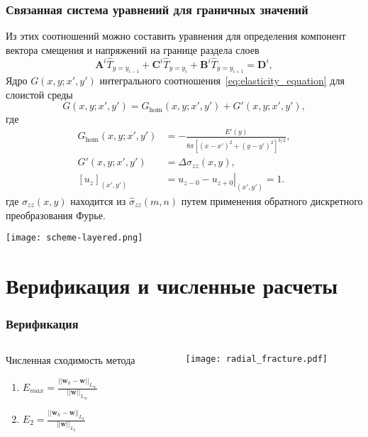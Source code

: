 \begin{frame}
    \frametitle{Связанная система уравнений для граничных значений}
    Из этих соотношений можно составить уравнения для определения компонент вектора смещения и напряжений на границе раздела слоев
    \begin{equation}
        \label{eq:coupled-system}
        \textbf{A}^i \hat{T}_{y=y_{i-1}} +
        \textbf{C}^i \hat{T}_{y=y_{i}} + 
        \textbf{B}^i \hat{T}_{y=y_{i+1}}
        = \textbf{D}^i,
    \end{equation}
    Ядро $G(x,y;x',y')$ интегрального соотношения~\eqref{eq:elasticity_equation} для слоистой среды
    \begin{equation}
        G(x,y;x',y') = G_\text{hom}(x,y;x',y') + G'(x,y;x',y'),
    \end{equation} 
    где
    \begin{equation}
        \begin{split}
            G_\text{hom}(x,y;x',y') & = - \frac{E'(y)}{8\pi [(x\!-\!x')^2+(y\!-\!y')^2]^{3/2}},\\
            G'(x,y;x',y') & = \Delta \sigma_{zz}(x,y),\\
            \left[u_{z} \right]_{(x',y')} & = \left.u_{z-0} - u_{z+0}\right|_{(x',y')} = 1.
        \end{split}
    \end{equation}
    где $\sigma_{zz}(x,y)$ находится из $\hat{\sigma}_{zz}(m,n)$ путем применения обратного дискретного преобразования Фурье.
\end{frame}

\begin{frame}
    \centering
    \texttt{[image: scheme-layered.png]}
\end{frame}


\section{Верификация и численные расчеты}

\begin{frame}[t]
    \frametitle{Верификация}
    \begin{columns}
        \begin{column}{0.4\textwidth}
            Численная сходимость метода
            \begin{enumerate}
                \item $E_{max} = \frac{||\mathbf{w}_h - \mathbf{w}||_{L_\infty}}{||\mathbf{w}||_{L_\infty}}$
                \item $E_2 = \frac{||\mathbf{w}_h - \mathbf{w}||_{L_2}}{||\mathbf{w}||_{L_2}}$
            \end{enumerate}
        \end{column}
        \begin{column}{0.55\textwidth}
            \centering
            \texttt{[image: radial\_fracture.pdf]}
        \end{column}
    \end{columns}
\end{frame}

